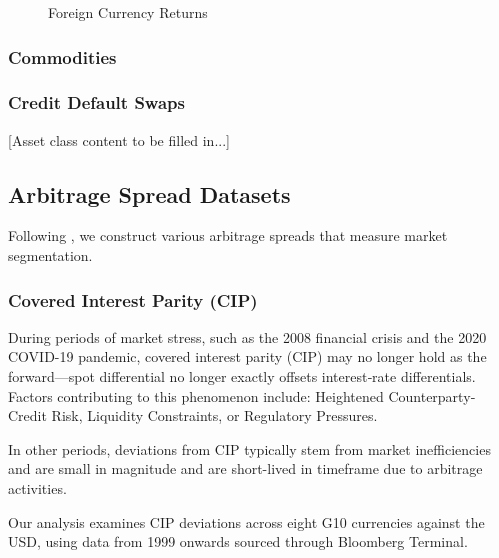 \documentclass{article}
\begin{document}
\begin{appendices}
\begin{figure}
  \caption{Foreign Currency Returns}
  \label{fig:fx_returns}
\end{figure}

\FloatBarrier

\subsubsection{Commodities}
\label{sec:commodities}

\subsubsection{Credit Default Swaps}
\label{sec:cds}

[Asset class content to be filled in...]

\subsection{Arbitrage Spread Datasets}
\label{sec:arbitrage}


Following \cite{Siriwardane2021}, we construct various arbitrage spreads that measure market segmentation.

\subsubsection{Covered Interest Parity (CIP)}
     

During periods of market stress, such as the 2008 financial crisis and the 2020 COVID-19
pandemic, covered interest parity (CIP) may no longer hold as the forward---spot differential 
no longer exactly offsets interest‐rate differentials. Factors contributing to this phenomenon include:
Heightened Counterparty‐Credit Risk, Liquidity Constraints, or Regulatory Pressures.

In other periods, deviations from CIP typically stem from market inefficiencies and are 
small in magnitude and are short-lived in timeframe due to arbitrage activities.

Our analysis examines CIP deviations across eight G10 currencies against the USD, 
using data from 1999 onwards sourced through Bloomberg Terminal.


\end{appendices}
\end{document}
